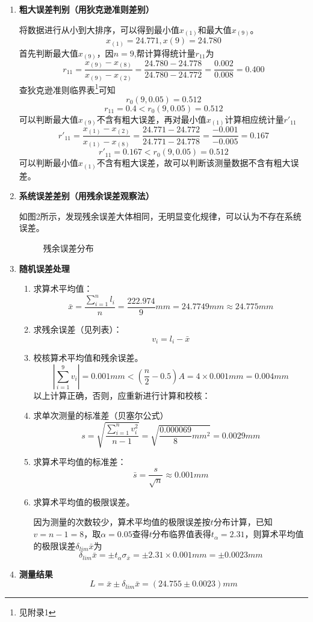 \begin{enumerate}
	\item \textbf{粗大误差判别（用狄克逊准则差别）}
	
	\qquad 将数据进行从小到大排序，可以得到最小值$ x_{(1)} $和最大值$ x_{(9)} $。\[ x_{(1)}=24.771,x{(9)}=24.780 \]
	首先判断最大值$ x_{(9)} $，因$ n=9 $,帮计算得统计量$ r_{11} $为\[ r_{11}=\frac{x_{(9)}-x_{(8)}}{x_{(9)}-x_{(2)}}=\frac{24.780-24.778}{24.780-24.772}=\frac{0.002}{0.008}=0.400 \]
	查狄克逊准则临界表\footnote{见附录1}可知\[ r_0(9,0.05)=0.512 \]\[ r_{11}=0.4<r_0(9,0.05)=0.512 \]
	可以判断最大值$ x_{(9)} $不含有粗大误差，再对最小值$ x_{(1)} $计算相应统计量$ r'_{11} $
	\[ r'_{11}=\frac{x_{(1)}-x_{(2)}}{x_{(1)}-x_{(8)}}=\frac{24.771-24.772}{24.771-24.778}=\frac{-0.001}{-0.005}=0.167 \]
	\[ r'_{11}=0.167<r_0(9,0.05)=0.512 \]
	可以判断最小值$ x_{(1)} $不含有粗大误差，故可以判断该测量数据不含有粗大误差。
	\item \textbf{系统误差差别（用残余误差观察法）}
	
	\qquad 如图2所示，发现残余误差大体相同，无明显变化规律，可以认为不存在系统误差。
	\begin{figure}[H]
		\centering
		\caption{残余误差分布}
	\end{figure}

	\item \textbf{随机误差处理}
		\begin{enumerate}
			\item 求算术平均值：\[ \bar{x}=\frac{\sum\limits_{i=1}^{n}l_i}{n}=\frac{222.974}{9}mm=24.7749mm\approx24.775mm \]
			\item 求残余误差（见列表）：\[ v_i=l_i-\bar{x} \]
			\item 校核算术平均值和残余误差。\[ \left| \sum\limits_{i=1}^{9}v_i \right|=0.001mm<\left(\frac{n}{2}-0.5\right)A=4\times0.001mm=0.004mm  \]
			以上计算正确，否则，应重新进行计算和校核：
			\item 求单次测量的标准差（贝塞尔公式）\[ s=\sqrt{\frac{\sum\limits_{i=1}^{n}v_i^2}{n-1}}=\sqrt{\frac{0.000069}{8}mm^2}=0.0029mm \]
			\item 求算术平均值的标准差：\[ \bar{s}=\frac{s}{\sqrt{n}}\approx0.001mm \]
			\item 求算术平均值的极限误差。
			
			\qquad 因为测量的次数较少，算术平均值的极限误差按$ t $分布计算，已知$ v=n-1=8 $，取$ \alpha=0.05 $查得$ t $分布临界值表得$ t_\alpha=2.31 $，则算术平均值的极限误差$ \delta_{lim}\bar{x} $为\[ \delta_{lim}\bar{x}=\pm t_\alpha\sigma_{\bar{x}}=\pm2.31\times0.001mm=\pm0.0023mm \]
		\end{enumerate}
	\item \textbf{测量结果}\[ L=\bar{x}\pm\delta_{lim}\bar{x}=(24.755\pm0.0023)mm \]
\end{enumerate}
